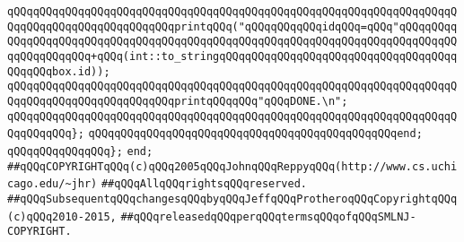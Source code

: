 \verb|qQQqqQQqqQQqqQQqqQQqqQQqqQQqqQQqqQQqqQQqqQQqqQQqqQQqqQQqqQQqqQQqqQQqqQQqqQQqqQQqqQQqqQQqqQQqqQQqprintqQQq("qQQqqQQqqQQqidqQQq=qQQq"qQQqqQQqqQQqqQQqqQQqqQQqqQQqqQQqqQQqqQQqqQQqqQQqqQQqqQQqqQQqqQQqqQQqqQQqqQQqqQQqqQQqqQQqqQQq+qQQq(int::to_stringqQQqqQQqqQQqqQQqqQQqqQQqqQQqqQQqqQQqqQQqqQQqbox.id));|\newline
\verb|qQQqqQQqqQQqqQQqqQQqqQQqqQQqqQQqqQQqqQQqqQQqqQQqqQQqqQQqqQQqqQQqqQQqqQQqqQQqqQQqqQQqqQQqqQQqqQQqprintqQQqqQQq"qQQqDONE.\n";|\newline
\verb|qQQqqQQqqQQqqQQqqQQqqQQqqQQqqQQqqQQqqQQqqQQqqQQqqQQqqQQqqQQqqQQqqQQqqQQqqQQqqQQq};|\newline
\newline
\verb|qQQqqQQqqQQqqQQqqQQqqQQqqQQqqQQqqQQqqQQqqQQqqQQqend;|\newline
\verb|qQQqqQQqqQQqqQQq};|\newline
\verb|end;|\newline
\newline
\verb|##qQQqCOPYRIGHTqQQq(c)qQQq2005qQQqJohnqQQqReppyqQQq(http://www.cs.uchicago.edu/~jhr)|\newline
\verb|##qQQqAllqQQqrightsqQQqreserved.|\newline
\verb|##qQQqSubsequentqQQqchangesqQQqbyqQQqJeffqQQqProtheroqQQqCopyrightqQQq(c)qQQq2010-2015,|\newline
\verb|##qQQqreleasedqQQqperqQQqtermsqQQqofqQQqSMLNJ-COPYRIGHT.|\newline


